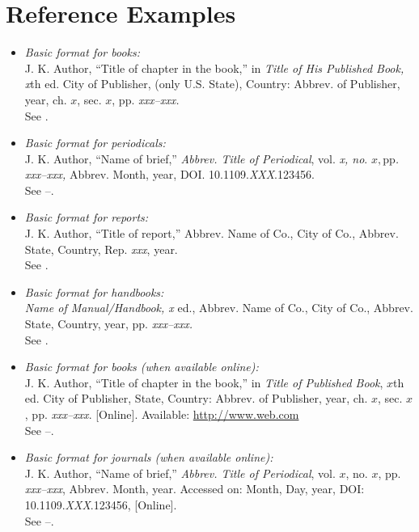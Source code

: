 \documentclass{IEEEtran}
\begin{document}
\vfill
\pagebreak

\section{Reference Examples}

\begin{itemize}

\item \emph{Basic format for books:}\\
J. K. Author, ``Title of chapter in the book,'' in \emph{Title of His Published Book, x}th ed. City of Publisher, (only U.S. State), Country: Abbrev. of Publisher, year, ch. $x$, sec. $x$, pp. \emph{xxx--xxx.}\\
See \cite{b1,b2}.

\item \emph{Basic format for periodicals:}\\
J. K. Author, ``Name of brief,'' \emph{Abbrev. Title of Periodical}, vol. \emph{x, no}. $x, $pp\emph{. xxx--xxx, }Abbrev. Month, year, DOI. 10.1109.\emph{XXX}.123456.\\
See \cite{b3}--\cite{b5}.

\item \emph{Basic format for reports:}\\
J. K. Author, ``Title of report,'' Abbrev. Name of Co., City of Co., Abbrev. State, Country, Rep. \emph{xxx}, year.\\
See \cite{b6,b7}.

\item \emph{Basic format for handbooks:}\\
\emph{Name of Manual/Handbook, x} ed., Abbrev. Name of Co., City of Co., Abbrev. State, Country, year, pp. \emph{xxx--xxx.}\\
See \cite{b8,b9}.

\item \emph{Basic format for books (when available online):}\\
J. K. Author, ``Title of chapter in the book,'' in \emph{Title of
Published Book}, $x$th ed. City of Publisher, State, Country: Abbrev.
of Publisher, year, ch. $x$, sec. $x$, pp. \emph{xxx--xxx}. [Online].
Available: \underline{http://www.web.com}\\
See \cite{b10}--\cite{b13}.

\item \emph{Basic format for journals (when available online):}\\
J. K. Author, ``Name of brief,'' \emph{Abbrev. Title of Periodical}, vol. $x$, no. $x$, pp. \emph{xxx--xxx}, Abbrev. Month, year. Accessed on: Month, Day, year, DOI: 10.1109.\emph{XXX}.123456, [Online].\\
See \cite{b14}--\cite{b16}.


\end{itemize}
\end{document}
